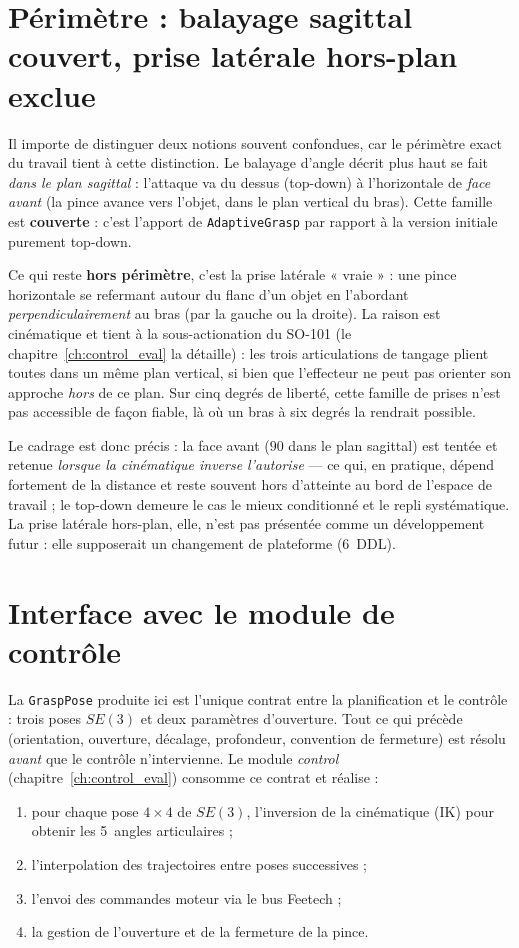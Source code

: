 \section{Périmètre : balayage sagittal couvert, prise latérale hors-plan exclue}
\label{sec:plan_horsportee}

Il importe de distinguer deux notions souvent confondues, car le périmètre exact
du travail tient à cette distinction. Le balayage d'angle décrit plus haut se fait
\emph{dans le plan sagittal} : l'attaque va du dessus (top-down) à l'horizontale de
\emph{face avant} (la pince avance vers l'objet, dans le plan vertical du bras).
Cette famille est \textbf{couverte} : c'est l'apport de \texttt{AdaptiveGrasp} par
rapport à la version initiale purement top-down.

Ce qui reste \textbf{hors périmètre}, c'est la prise latérale « vraie » : une pince
horizontale se refermant autour du flanc d'un objet en l'abordant
\emph{perpendiculairement} au bras (par la gauche ou la droite). La raison est
cinématique et tient à la sous-actionation du SO-101 (le chapitre~\ref{ch:control_eval}
la détaille) : les trois articulations de tangage plient toutes dans un même plan
vertical, si bien que l'effecteur ne peut pas orienter son approche \emph{hors} de
ce plan. Sur cinq degrés de liberté, cette famille de prises n'est pas accessible
de façon fiable, là où un bras à six degrés la rendrait possible.

Le cadrage est donc précis : la face avant (\(90\)\textdegree{} dans le plan sagittal)
est tentée et retenue \emph{lorsque la cinématique inverse l'autorise} --- ce qui,
en pratique, dépend fortement de la distance et reste souvent hors d'atteinte au
bord de l'espace de travail ; le top-down demeure le cas le mieux conditionné et le
repli systématique. La prise latérale hors-plan, elle, n'est pas présentée comme un
développement futur : elle supposerait un changement de plateforme (6~DDL).

\section{Interface avec le module de contrôle}
\label{sec:plan_interface}

La \texttt{GraspPose} produite ici est l'unique contrat entre la planification et
le contrôle : trois poses \(SE(3)\) et deux paramètres d'ouverture. Tout ce qui
précède (orientation, ouverture, décalage, profondeur, convention de fermeture)
est résolu \emph{avant} que le contrôle n'intervienne. Le module \textit{control}
(chapitre~\ref{ch:control_eval}) consomme ce contrat et réalise :
\begin{enumerate}
  \item pour chaque pose \(4\times4\) de \(SE(3)\), l'inversion de la cinématique
        (IK) pour obtenir les 5~angles articulaires ;
  \item l'interpolation des trajectoires entre poses successives ;
  \item l'envoi des commandes moteur via le bus Feetech ;
  \item la gestion de l'ouverture et de la fermeture de la pince.
\end{enumerate}

